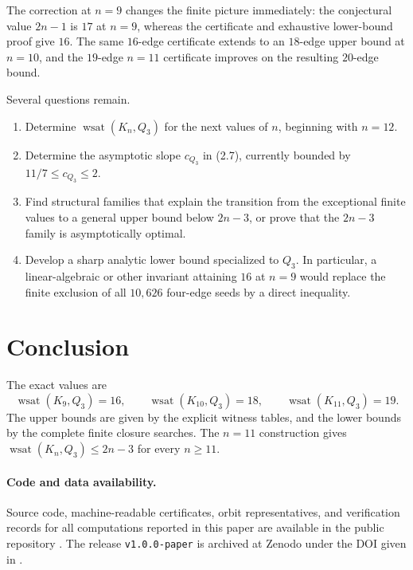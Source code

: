 \documentclass[11pt]{article}
\numberwithin{equation}{section}
\newcommand{\wsat}{\operatorname{wsat}}
\begin{document}
The correction at $n=9$ changes the finite picture immediately: the conjectural value $2n-1$ is $17$ at $n=9$, whereas the certificate and exhaustive lower-bound proof give $16$. The same $16$-edge certificate extends to an $18$-edge upper bound at $n=10$, and the $19$-edge $n=11$ certificate improves on the resulting $20$-edge bound.

Several questions remain.

\begin{enumerate}[leftmargin=2em]
\item Determine $\wsat(K_n,Q_3)$ for the next values of $n$, beginning with $n=12$.
\item Determine the asymptotic slope $c_{Q_3}$ in (2.7), currently bounded by $11/7\le c_{Q_3}\le2$.
\item Find structural families that explain the transition from the exceptional finite values to a general upper bound below $2n-3$, or prove that the $2n-3$ family is asymptotically optimal.
\item Develop a sharp analytic lower bound specialized to $Q_3$. In particular, a linear-algebraic or other invariant attaining $16$ at $n=9$ would replace the finite exclusion of all $10,626$ four-edge seeds by a direct inequality.
\end{enumerate}

\section{Conclusion}
The exact values are
\[
\boxed{\wsat(K_9,Q_3)=16,\qquad
\wsat(K_{10},Q_3)=18,\qquad
\wsat(K_{11},Q_3)=19.}
\]
The upper bounds are given by the explicit witness tables, and the lower
bounds by the complete finite closure searches. The $n=11$ construction gives
$\wsat(K_n,Q_3)\le2n-3$ for every $n\ge11$.

\paragraph{Code and data availability.}
Source code, machine-readable certificates, orbit representatives, and
verification records for all computations reported in this paper are
available in the public repository \cite{SahaCode}. The release
\texttt{v1.0.0-paper} is archived at Zenodo under the DOI given in
\cite{SahaCode}.


\newpage
\end{document}
